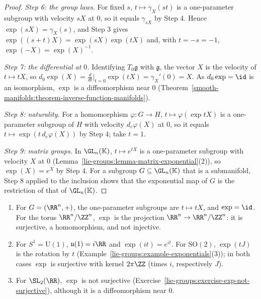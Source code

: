 \begin{proof}
\emph{Step 6: the group laws.} For fixed $s$, $t \mapsto \gamma_X(st)$ is a one-parameter subgroup with velocity $sX$ at $0$, so it equals $\gamma_{sX}$ by
Step 4. Hence $\exp(sX) = \gamma_X(s)$, and Step 3 gives $\exp((s + t)X) = \exp(sX)\exp(tX)$ and, with $t = -s = -1$, $\exp(-X) = \exp(X)^{-1}$.

\emph{Step 7: the differential at $0$.} Identifying $T_0\mathfrak{g}$ with $\mathfrak{g}$, the vector $X$ is the velocity of $t \mapsto tX$, so
$d_0\exp(X) = \frac{d}{dt}\big|_{t=0}\exp(tX) = \gamma_X'(0) = X$. As $d_0\exp = \id$ is an isomorphism, $\exp$ is a diffeomorphism near $0$
(Theorem~\ref{smooth-manifolds:theorem-inverse-function-manifolds}).

\emph{Step 8: naturality.} For a homomorphism $\varphi \colon G \to H$, $t \mapsto \varphi(\exp tX)$ is a one-parameter subgroup of $H$ with velocity
$d_e\varphi(X)$ at $0$, so it equals $t \mapsto \exp(t\,d_e\varphi(X))$ by Step 4; take $t = 1$.

\emph{Step 9: matrix groups.} In $\GL_n(\mathbb{K})$, $t \mapsto e^{tX}$ is a one-parameter subgroup with velocity $X$ at $0$
(Lemma~\ref{lie-groups:lemma-matrix-exponential}(2)), so $\exp(X) = e^X$ by Step 4. For a subgroup $G \subseteq \GL_n(\mathbb{K})$ that is a submanifold, Step 8
applied to the inclusion shows that the exponential map of $G$ is the restriction of that of $\GL_n(\mathbb{K})$.
\end{proof}

\begin{example}\label{lie-groups:example-exponential-maps}
\begin{enumerate}
\item For $G = (\RR^n, +)$, the one-parameter subgroups are $t \mapsto tX$, and $\exp = \id$. For the torus $\RR^n/\ZZ^n$, $\exp$ is the projection
$\RR^n \to \RR^n/\ZZ^n$: it is surjective, a homomorphism, and not injective.
\item For $S^1 = \mathrm{U}(1)$, $\mathfrak{u}(1) = i\RR$ and $\exp(it) = e^{it}$. For $\mathrm{SO}(2)$, $\exp(tJ)$ is the rotation by $t$
(Example~\ref{lie-groups:example-exponentials}(3)); in both cases $\exp$ is surjective with kernel $2\pi\ZZ$ (times $i$, respectively $J$).
\item For $\SL_2(\RR)$, $\exp$ is not surjective (Exercise~\ref{lie-groups:exercise-exp-not-surjective}), although it is a diffeomorphism near $0$.
\end{enumerate}
\end{example}

